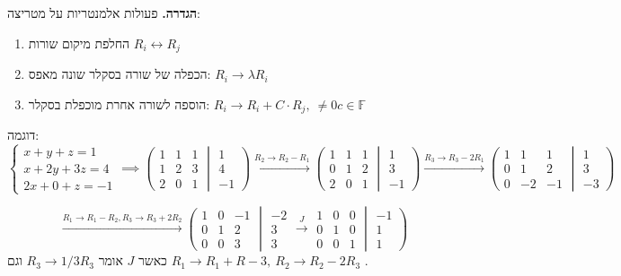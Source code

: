 \documentclass[]{article}
\newcommand\siff  {\longleftrightarrow}
\newcommand\F     {\mathbb{F}}
\newcommand\cl [1]    {\left ( #1 \right )}
\begin{document}
	\textbf{הגדרה. }פעולות אלמנטריות על מטריצה: 
	\begin{enumerate}
		\item החלפת מיקום שורות $R_i \siff R_j$\\
		\item הכפלה של שורה בסקלר שונה מאפס: $R_i \to \lambda R_i$
		\item הוספה לשורה אחרת מוכפלת בסקלר: $R_i \to R_i + C \cdot R_j, \ \neq 0 c \in \F$
	\end{enumerate}
	
	דוגמה: 
	\[ \begin{cases}
		x + y + z = 1 \\
		x + 2y + 3z = 4\\
		2x + 0 + z = -1
	\end{cases} \implies \left( 
	\begin{matrix}
		1  & 1 & 1\\
		1 & 2 & 3 \\
		2 & 0 & 1
	\end{matrix}
	\middle\vert
	\begin{matrix}
		1 \\
		4 \\
		-1
	\end{matrix}
	\right) \overset{R_2 \to R_2 - R_1}{\to} \cl{\begin{matrix}
			1 & 1 &1 \\
			0 & 1 & 2 \\
			2 & 0 & 1
	\end{matrix} \middle\vert \begin{matrix}
	1 \\ 3 \\ -1
\end{matrix}} \overset{R_3 \to R_3 - 2R_1}{\to} \cl{\begin{matrix}
			1 &1 & 1 \\
			0 & 1 & 2\\
			0 & -2 & -1
\end{matrix}\middle\vert\begin{matrix}
1 \\ 3 \\ -3
\end{matrix}} \]

\[ \overset{R_1 \to R_1 - R_2, R_3 \to R_3 + 2R_2}{\to} \cl{\begin{matrix}
		1 & 0 & -1 \\
		0 & 1 & 2 \\
		0 & 0 & 3
\end{matrix}\middle\vert\begin{matrix}
-2 \\ 3 \\ 3
\end{matrix} \overset{J}{\to} \begin{matrix}
1 & 0 & 0 \\
0 & 1 & 0\\
0 & 0 &1
\end{matrix}\middle\vert\begin{matrix}
-1 \\ 1\\1
\end{matrix}}
 \]
 כאשר $J$ אומר $R_3 \to 1 / 3R_3$ וגם $R_1 \to R_1 + R-3, \ R_2 \to R_2 - 2R_3$ . 
 
\end{document}
